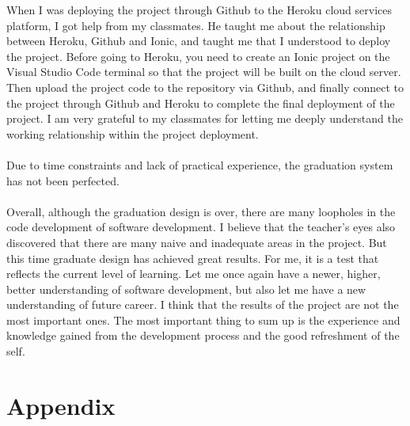 When I was deploying the project through Github to the Heroku cloud services platform, I got help from my classmates. He taught me about the relationship between Heroku, Github and Ionic, and taught me that I understood to deploy the project. Before going to Heroku, you need to create an Ionic project on the Visual Studio Code terminal so that the project will be built on the cloud server. Then upload the project code to the repository via Github, and finally connect to the project through Github and Heroku to complete the final deployment of the project. I am very grateful to my classmates for letting me deeply understand the working relationship within the project deployment. \\ \\ 
Due to time constraints and lack of practical experience, the graduation system has not been perfected. 
\\ \\ 
Overall, although the graduation design is over, there are many loopholes in the code development of software development. I believe that the teacher's eyes also discovered that there are many naive and inadequate areas in the project. But this time graduate design has achieved great results. For me, it is a test that reflects the current level of learning. Let me once again have a newer, higher, better understanding of software development, but also let me have a new understanding of future career. I think that the results of the project are not the most important ones. The most important thing to sum up is the experience and knowledge gained from the development process and the good refreshment of the self.


\chapter{Appendix}


